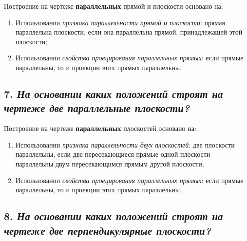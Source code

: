 Построение на чертеже {\bf параллельных} прямой и плоскости основано на:

\begin{enumerate}
    \item Использовании \textit {признака параллельности прямой и плоскости}: прямая параллельна плоскости, если она параллельна прямой, принадлежащей этой плоскости;
    \item Использовании \textit {свойства проецирования параллельных прямых}: если прямые параллельны, то и проекции этих прямых параллельны.
\end{enumerate}




\newpage
\subsection*{7. \textit{На основании каких положений строят на чертеже две параллельные плоскости?}}

\begin{mainQuote}
    
\end{mainQuote}

Построение на чертеже {\bf параллельных} плоскостей основано на:

\begin{enumerate}
    \item Использовании \textit {признака параллельности двух плоскостей}: две плоскости параллельны, если две пересекающиеся прямые одной плоскости параллельны двум пересекающимся прямым другой плоскости;
    \item Использовании \textit {свойства проецирования параллельных прямых}: если прямые параллельны, то и проекции этих прямых параллельны.
\end{enumerate}


\newpage
\subsection*{8. \textit{На основании каких положений строят на чертеже две перпендикулярные плоскости?}}

